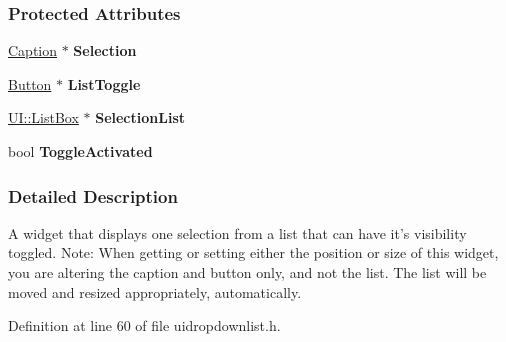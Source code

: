 \subsubsection*{Protected Attributes}
\begin{DoxyCompactItemize}
\item 
\hypertarget{classphys_1_1UI_1_1DropDownList_a91eee0b439bb7241ac5fd25eaa8cb554}{
\hyperlink{classphys_1_1UI_1_1Caption}{Caption} $\ast$ {\bfseries Selection}}
\label{classphys_1_1UI_1_1DropDownList_a91eee0b439bb7241ac5fd25eaa8cb554}

\item 
\hypertarget{classphys_1_1UI_1_1DropDownList_a7483ac2d5fb3113a2c05eae863f925c8}{
\hyperlink{classphys_1_1UI_1_1Button}{Button} $\ast$ {\bfseries ListToggle}}
\label{classphys_1_1UI_1_1DropDownList_a7483ac2d5fb3113a2c05eae863f925c8}

\item 
\hypertarget{classphys_1_1UI_1_1DropDownList_a55d5b34f7ec20da239caf1af1aad1abf}{
\hyperlink{classphys_1_1UI_1_1ListBox}{UI::ListBox} $\ast$ {\bfseries SelectionList}}
\label{classphys_1_1UI_1_1DropDownList_a55d5b34f7ec20da239caf1af1aad1abf}

\item 
\hypertarget{classphys_1_1UI_1_1DropDownList_a298f854373f5d666ef93daa2c183febe}{
bool {\bfseries ToggleActivated}}
\label{classphys_1_1UI_1_1DropDownList_a298f854373f5d666ef93daa2c183febe}

\end{DoxyCompactItemize}


\subsubsection{Detailed Description}
A widget that displays one selection from a list that can have it's visibility toggled. Note: When getting or setting either the position or size of this widget, you are altering the caption and button only, and not the list. The list will be moved and resized appropriately, automatically. 

Definition at line 60 of file uidropdownlist.h.




